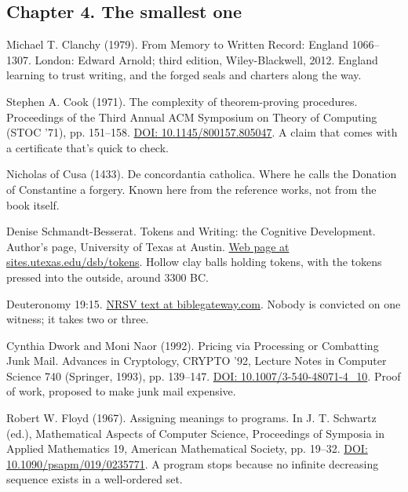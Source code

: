\documentclass[11pt,twoside]{article}
\theoremstyle{thielethm}
\theoremstyle{thieledef}
\theoremstyle{thieledef}
\theoremstyle{thieledef}
\theoremstyle{thielethm}
\theoremstyle{thieleobs}
\theoremstyle{thielethm}
\begin{document}
\subsection*{Chapter 4. The smallest one}

\noindent Michael T. Clanchy (1979). From Memory to Written Record: England 1066--1307. London: Edward Arnold; third edition, Wiley-Blackwell, 2012. England learning to trust writing, and the forged seals and charters along the way.
\par\medskip

\noindent Stephen A. Cook (1971). The complexity of theorem-proving procedures. Proceedings of the Third Annual ACM Symposium on Theory of Computing (STOC '71), pp. 151--158. \href{https://doi.org/10.1145/800157.805047}{DOI: 10.1145/800157.805047}. A claim that comes with a certificate that's quick to check.
\par\medskip

\noindent Nicholas of Cusa (1433). De concordantia catholica. Where he calls the Donation of Constantine a forgery. Known here from the reference works, not from the book itself.
\par\medskip

\noindent Denise Schmandt-Besserat. Tokens and Writing: the Cognitive Development. Author's page, University of Texas at Austin. \href{https://sites.utexas.edu/dsb/tokens/tokens-and-writing-the-cognitive-development/}{Web page at sites.utexas.edu/dsb/tokens}. Hollow clay balls holding tokens, with the tokens pressed into the outside, around 3300 BC.
\par\medskip

\noindent Deuteronomy 19:15. \href{https://www.biblegateway.com/passage/?search=Deuteronomy+19:15&version=NRSV}{NRSV text at biblegateway.com}. Nobody is convicted on one witness; it takes two or three.
\par\medskip

\noindent Cynthia Dwork and Moni Naor (1992). Pricing via Processing or Combatting Junk Mail. Advances in Cryptology, CRYPTO '92, Lecture Notes in Computer Science 740 (Springer, 1993), pp. 139--147. \href{https://doi.org/10.1007/3-540-48071-4_10}{DOI: 10.1007/3-540-48071-4\_10}. Proof of work, proposed to make junk mail expensive.
\par\medskip

\noindent Robert W. Floyd (1967). Assigning meanings to programs. In J. T. Schwartz (ed.), Mathematical Aspects of Computer Science, Proceedings of Symposia in Applied Mathematics 19, American Mathematical Society, pp. 19--32. \href{https://doi.org/10.1090/psapm/019/0235771}{DOI: 10.1090/psapm/019/0235771}. A program stops because no infinite decreasing sequence exists in a well-ordered set.
\par\medskip
\end{document}
